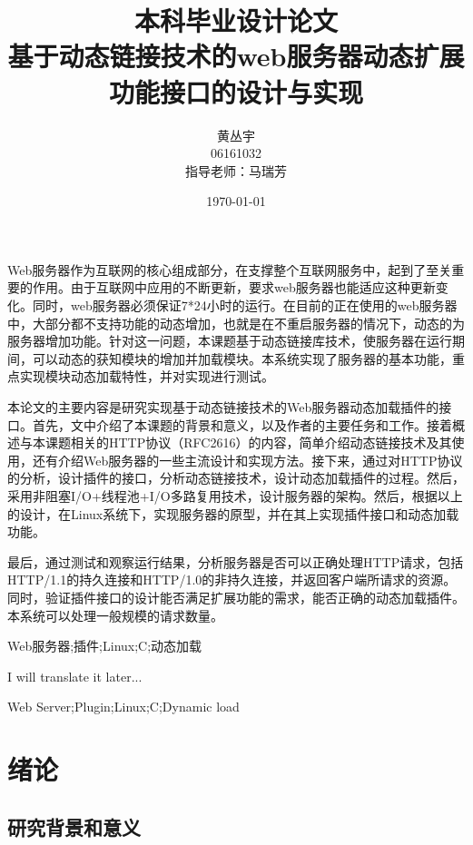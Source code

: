 \documentclass[18pt, twoside, a4paper, dvipdfm]{book}
\begin{document}
\title{{\Huge 本科毕业设计论文\\}基于动态链接技术的web服务器动态扩展功能接口的设计与实现}
\author{黄丛宇\\06161032\\指导老师：马瑞芳}
\date{\today}

\maketitle

\lfour

\zhabstract 

Web服务器作为互联网的核心组成部分，在支撑整个互联网服务中，起到了至关重要的作用。由于互联网中应用的不断更新，要求web服务器也能适应这种更新变化。同时，web服务器必须保证7*24小时的运行。在目前的正在使用的web服务器中，大部分都不支持功能的动态增加，也就是在不重启服务器的情况下，动态的为服务器增加功能。针对这一问题，本课题基于动态链接库技术，使服务器在运行期间，可以动态的获知模块的增加并加载模块。本系统实现了服务器的基本功能，重点实现模块动态加载特性，并对实现进行测试。 

本论文的主要内容是研究实现基于动态链接技术的Web服务器动态加载插件的接口。首先，文中介绍了本课题的背景和意义，以及作者的主要任务和工作。接着概述与本课题相关的HTTP协议（RFC2616）的内容，简单介绍动态链接技术及其使用，还有介绍Web服务器的一些主流设计和实现方法。接下来，通过对HTTP协议的分析，设计插件的接口，分析动态链接技术，设计动态加载插件的过程。然后，采用非阻塞I/O+线程池+I/O多路复用技术，设计服务器的架构。然后，根据以上的设计，在Linux系统下，实现服务器的原型，并在其上实现插件接口和动态加载功能。

最后，通过测试和观察运行结果，分析服务器是否可以正确处理HTTP请求，包括HTTP/1.1的持久连接和HTTP/1.0的非持久连接，并返回客户端所请求的资源。同时，验证插件接口的设计能否满足扩展功能的需求，能否正确的动态加载插件。本系统可以处理一般规模的请求数量。

{\zhkeywords Web服务器;插件;Linux;C;动态加载}

\enabstract
I will translate it later...

{\enkeywords Web Server;Plugin;Linux;C;Dynamic load}

\newpage
\tableofcontents

\chapter{绪论}

\section{研究背景和意义}
\end{document}
